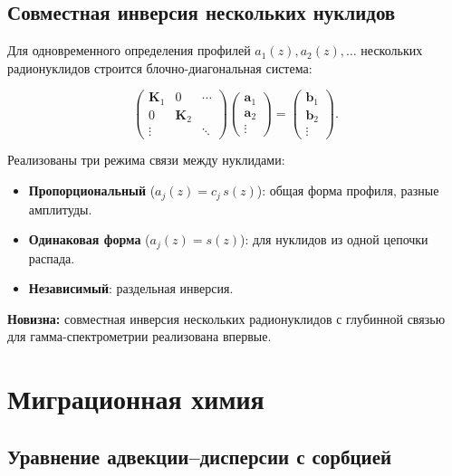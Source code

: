 \documentclass[12pt,a4paper]{article}
\newcommand{\va}{\mathbf{a}}
\newcommand{\vb}{\mathbf{b}}
\newcommand{\mK}{\mathbf{K}}
\begin{document}
\subsection{Совместная инверсия нескольких нуклидов}
\label{sub:joint}

Для одновременного определения профилей $a_1(z), a_2(z), \ldots$
нескольких радионуклидов строится блочно-диагональная система:

\begin{equation}
  \begin{pmatrix} \mK_1 & 0 & \cdots \\ 0 & \mK_2 & \\ \vdots & & \ddots \end{pmatrix}
  \begin{pmatrix} \va_1 \\ \va_2 \\ \vdots \end{pmatrix} =
  \begin{pmatrix} \vb_1 \\ \vb_2 \\ \vdots \end{pmatrix}.
\end{equation}

Реализованы три режима связи между нуклидами:

\begin{itemize}[leftmargin=*,itemsep=2pt]
  \item \textbf{Пропорциональный} ($a_j(z) = c_j\, s(z)$):
        общая форма профиля, разные амплитуды.
  \item \textbf{Одинаковая форма} ($a_j(z) = s(z)$):
        для нуклидов из одной цепочки распада.
  \item \textbf{Независимый}: раздельная инверсия.
\end{itemize}

\textbf{Новизна:} совместная инверсия нескольких радионуклидов
с глубинной связью для гамма-спектрометрии реализована впервые.


\section{Миграционная химия}
\label{sec:transport}

\subsection{Уравнение адвекции--дисперсии с сорбцией}
\label{sub:ade}
\end{document}
